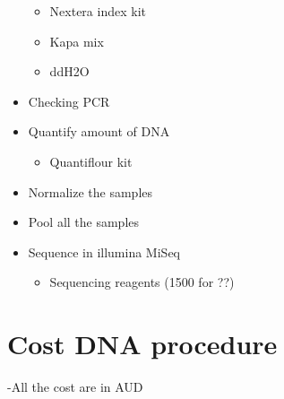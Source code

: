 \documentclass[11pt]{article}
\begin{document}
\begin{itemize}
\begin{itemize}
\item Nextera index kit
\item Kapa mix
\item ddH2O
\end{itemize}
\item Checking PCR
\item Quantify amount of DNA
\begin{itemize}
\item Quantiflour kit
\end{itemize}
\item Normalize the samples
\item Pool all the samples
\item Sequence in illumina MiSeq
\begin{itemize}
\item Sequencing reagents (1500 for ??)
\end{itemize}
\end{itemize}
\section*{Cost DNA procedure}
\label{sec-2}

-All the cost are in AUD
\end{document}
